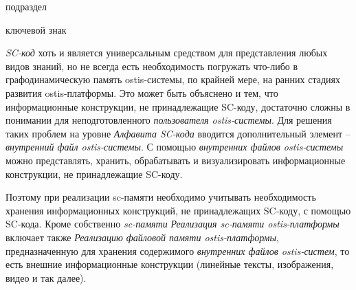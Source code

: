 \begin{SCn}

\begin{scnrelfromlist}{подраздел}
\end{scnrelfromlist}

\begin{scnrelfromlist}{ключевой знак}
	\begin{scnindent}
	\end{scnindent}
\end{scnrelfromlist}

\end{SCn}

\bigskip

\textit{SC-код} хоть и является универсальным средством для представления любых видов знаний, но не всегда есть необходимость погружать что-либо в графодинамическую память ostis-системы, по крайней мере, на ранних стадиях развития ostis-платформы. Это может быть объяснено и тем, что информационные конструкции, не принадлежащие SC-коду, достаточно сложны в понимании для неподготовленного \textit{пользователя ostis-системы}. Для решения таких проблем на уровне \textit{Алфавита SC-кода\scnsupergroupsign} вводится дополнительный элемент -- \textit{внутренний файл ostis-системы}. С помощью \textit{внутренних файлов ostis-системы} можно представлять, хранить, обрабатывать и визуализировать информационные конструкции, не принадлежащие SC-коду.

Поэтому при реализации sc-памяти необходимо учитывать необходимость хранения информационных конструкций, не принадлежащих SC-коду, с помощью SC-кода. Кроме собственно \textit{sc-памяти} \textit{Реализация sc-памяти ostis-платформы} включает также \textit{Реализацию файловой памяти ostis-платформы}, предназначенную для хранения содержимого \textit{внутренних файлов ostis-систем}, то есть внешние информационные конструкции (линейные тексты, изображения, видео и так далее).

